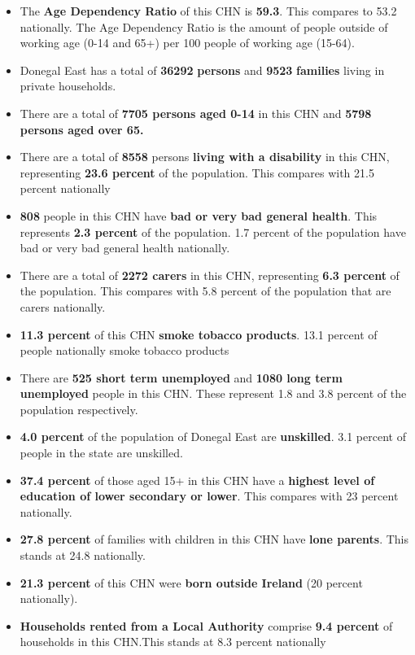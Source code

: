 \documentclass{article}
\begin{document}
\begin{itemize}

\item The \textbf{Age Dependency Ratio} of this CHN is  \textbf{59.3}. This compares to 53.2 nationally. The Age Dependency Ratio is the amount of people outside of working age (0-14 and 65+) per 100 people of working age (15-64). 

\item Donegal East has a total of \textbf{\num{36292}} \textbf{persons} and  \textbf{\num{9523}} \textbf{families} living in private households.

\item There are a total of \textbf{\num{7705} persons aged 0-14} in this CHN and \textbf{\num{5798} persons aged over 65.} 

\item There are a total of \textbf{\num{8558}} persons \textbf{living with a disability} in this CHN, representing \textbf{23.6 percent} of the population. This compares with  21.5 percent nationally

\item \textbf{\num{808}} people in this CHN have \textbf{bad or very bad general health}. This represents \textbf{2.3 percent} of the population. 1.7 percent of the population have bad or very bad general health nationally. 

\item There are a total of \textbf{\num{2272} carers} in this CHN, representing \textbf{6.3 percent} of the population. This compares with 5.8 percent of the population that are carers nationally. 

\item \textbf{11.3 percent} of this CHN \textbf{smoke tobacco products}. 13.1 percent of people nationally smoke tobacco products

\item There are \textbf{\num{525} short term unemployed} and \textbf{\num{1080} long term unemployed} people in this CHN. These represent 1.8 and 3.8 percent of the population respectively.

\item  \textbf{4.0 percent} of the population of Donegal East are \textbf{unskilled}. 3.1 percent of people in the state are unskilled.

\item \textbf{37.4 percent} of those aged 15+ in this CHN have a \textbf{highest level of education of lower secondary or lower}. This compares with 23 percent nationally. 

\item \textbf{27.8 percent} of families with children in this CHN have \textbf{lone parents}. This stands at 24.8 nationally.

\item \textbf{21.3 percent} of this CHN were \textbf{born outside Ireland} (20 percent nationally).

\item \textbf{Households rented from a Local Authority} comprise \textbf{9.4 percent} of households in this CHN.This stands at 8.3 percent nationally

\end{itemize}
\end{document}

